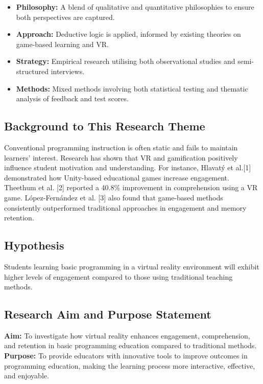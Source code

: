 \documentclass[conference]{IEEEtran}
\begin{document}
\begin{itemize}
    \item \textbf{Philosophy:} A blend of qualitative and quantitative philosophies to ensure both perspectives are captured.
    \item \textbf{Approach:} Deductive logic is applied, informed by existing theories on game-based learning and VR.
    \item \textbf{Strategy:} Empirical research utilising both observational studies and semi-structured interviews.
    \item \textbf{Methods:} Mixed methods involving both statistical testing and thematic analysis of feedback and test scores.
\end{itemize}

\subsection{Background to This Research Theme}
Conventional programming instruction is often static and fails to maintain learners’ interest. Research has shown that VR and gamification positively influence student motivation and understanding. For instance, Hlavatý et al.[1] demonstrated how Unity-based educational games increase engagement. Theethum et al. [2] reported a 40.8\% improvement in comprehension using a VR game. López-Fernández et al. [3] also found that game-based methods consistently outperformed traditional approaches in engagement and memory retention.

\subsection{Hypothesis}
Students learning basic programming in a virtual reality environment will exhibit higher levels of engagement compared to those using traditional teaching methods.

\subsection{Research Aim and Purpose Statement}
\textbf{Aim:} To investigate how virtual reality enhances engagement, comprehension, and retention in basic programming education compared to traditional methods.\\
\textbf{Purpose:} To provide educators with innovative tools to improve outcomes in programming education, making the learning process more interactive, effective, and enjoyable.
\end{document}
